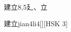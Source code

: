 \begin{entry}{建立}{8,5}{⼵、⽴}
  \begin{phonetics}{建立}{jian4li4}[][HSK 3]
  \end{phonetics}
\end{entry}
